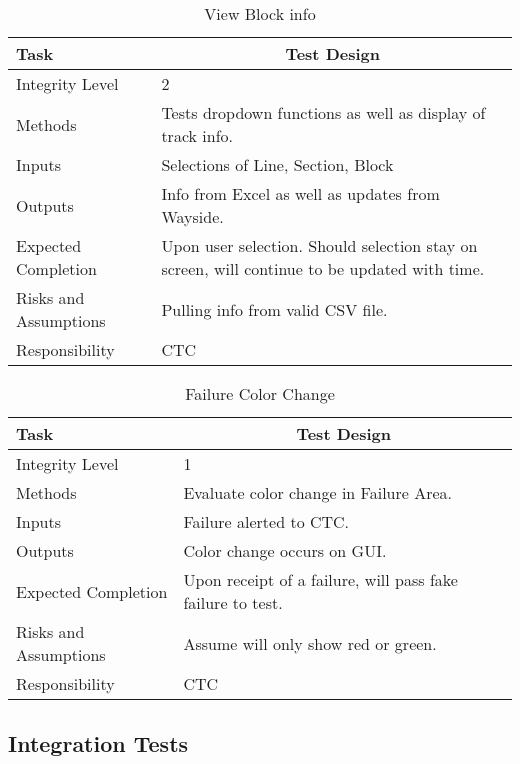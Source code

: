 \documentclass[]{article}
\begin{document}
\begin{table}[H]
	\centering
	\caption{View Block info}
	\begin{tabular}{|l|l|}
		\hline
		Task & \multicolumn{1}{c|}{Test Design} \\ \hline
		Integrity Level & 2 \\ \hline
		Methods & Tests dropdown functions as well as display of track info.\\ \hline
		Inputs &  Selections of Line, Section, Block \\ \hline
		Outputs &  Info from Excel as well as updates from Wayside.\\ \hline
		Expected Completion & \parbox[t]{10cm}{Upon user selection. Should selection stay on screen, will continue to be updated with time.}\\ \hline
		Risks and Assumptions & \parbox[t]{10cm}{Pulling info from valid CSV file.} \\ \hline
		Responsibility & CTC\\ \hline
	\end{tabular}
\end{table}

\begin{table}[H]
	\centering
	\caption{Failure Color Change}
	\begin{tabular}{|l|l|}
		\hline
		Task & \multicolumn{1}{c|}{Test Design} \\ \hline
		Integrity Level & 1 \\ \hline
		Methods & Evaluate color change in Failure Area.\\ \hline
		Inputs &  Failure alerted to CTC. \\ \hline
		Outputs &  Color change occurs on GUI. \\ \hline
		Expected Completion & \parbox[t]{10cm}{Upon receipt of a failure, will pass fake failure to test.}\\ \hline
		Risks and Assumptions & \parbox[t]{10cm}{Assume will only show red or green.} \\ \hline
		Responsibility & CTC\\ \hline
	\end{tabular}
\end{table}
\subsection{Integration Tests}
\end{document}
